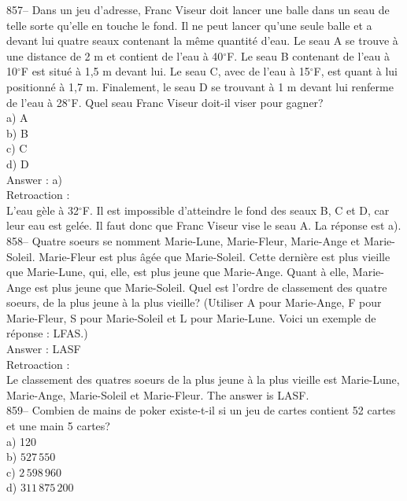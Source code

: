 ﻿\documentclass[letterpaper, 12pt]{article}
\begin{document}
857-- Dans un jeu d'adresse, Franc Viseur doit lancer une balle dans
un seau de telle sorte qu'elle en touche le fond.  Il ne peut lancer
qu'une seule balle et a devant lui quatre seaux contenant la m\^eme
quantit\'e d'eau.  Le seau A se trouve \`a une distance de 2 m et
contient de l'eau \`a 40$^{\circ}$F.  Le seau B contenant de l'eau
\`a 10$^{\circ}$F est situ\'e \`a 1,5 m devant lui.  Le seau C, avec
de l'eau \`a 15$^{\circ}$F, est quant \`a lui positionn\'e \`a 1,7
m. Finalement, le seau D se trouvant \`a 1 m devant lui renferme de
l'eau \`a 28$^{\circ}$F.
Quel seau Franc Viseur doit-il viser pour gagner?\\
a) A\\
b) B\\
c) C\\
d) D\\

Answer : a)\\

Retroaction : \\
L'eau g\`ele \`a 32$^{\circ}$F.  Il est impossible d'atteindre le fond des
seaux B, C et D,
car leur eau est gel\'ee.  Il faut donc que Franc Viseur vise le seau A. La
r\'eponse est a).\\

858-- Quatre soeurs se nomment Marie-Lune, Marie-Fleur, Marie-Ange
et Marie-Soleil.  Marie-Fleur est plus \^ag\'ee que Marie-Soleil.
Cette derni\`ere est plus vieille que Marie-Lune, qui, elle, est
plus jeune que Marie-Ange.  Quant \`a elle, Marie-Ange est plus
jeune que Marie-Soleil. Quel est l'ordre de classement des quatre
soeurs, de la plus jeune \`a la plus vieille? (Utiliser A pour
Marie-Ange, F pour Marie-Fleur, S pour Marie-Soleil et L pour
Marie-Lune.
Voici un exemple de r\'eponse : LFAS.)\\

Answer : LASF\\

Retroaction : \\
Le classement des quatres soeurs de la plus jeune \`a la plus vieille est
Marie-Lune, Marie-Ange, Marie-Soleil et Marie-Fleur.  The answer is
LASF.\\


859-- Combien de mains de poker existe-t-il si un jeu de cartes contient 52
cartes et une main 5 cartes?\\
a) 120\\
b) $527\,550$\\
c) $2\,598\,960$\\
d) $311\,875\,200$\\
\end{document}
